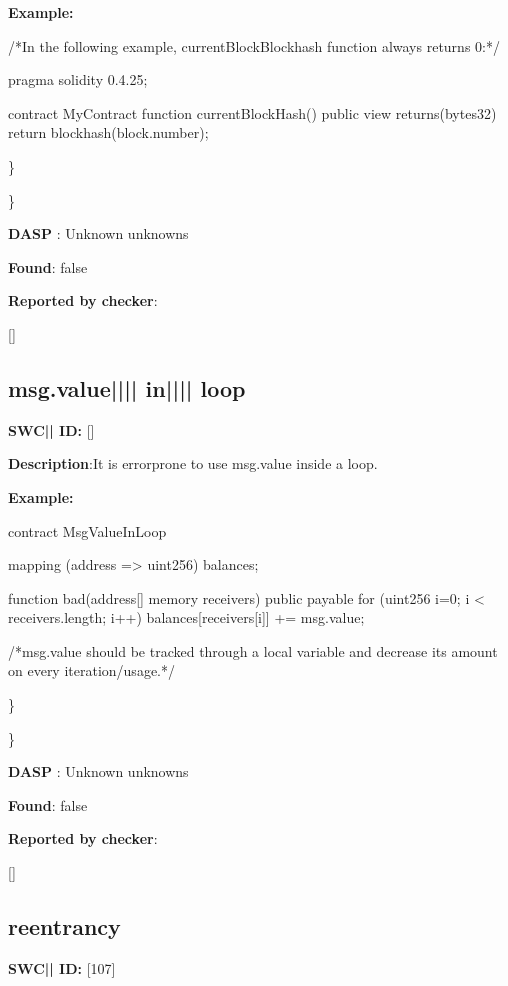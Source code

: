 \documentclass{article}
\begin{document}
\textbf{Example:} 
\begin{ffcode} 

/*In the following example, currentBlockBlockhash function always returns 0:*/ 

pragma solidity 0.4.25;

contract MyContract {
    function currentBlockHash() public view returns(bytes32) {
        return blockhash(block.number);
    }
}

\end{ffcode} 
\} 

\} 

\textbf{DASP} : Unknown unknowns

\textbf{Found}: false

\textbf{Reported by checker}: 
\begin{ffcode} 

[]
\end{ffcode} 
\subsection{msg.value{||\textunderscore|| }in{||\textunderscore|| }loop} 
\textbf{SWC{|\textunderscore| }ID:} []

\textbf{Description}:It is error{\textendash}prone to use msg.value inside a loop.


\textbf{Example:} 
\begin{ffcode} 

contract MsgValueInLoop{
    mapping (address => uint256) balances;

    function bad(address[] memory receivers) public payable {
        for (uint256 i=0; i < receivers.length; i++) {
            balances[receivers[i]] += msg.value;
        }
    }
}

 /*msg.value should be tracked through a local variable and decrease its amount on every iteration/usage.*/ 

\end{ffcode} 
\} 

\} 

\textbf{DASP} : Unknown unknowns

\textbf{Found}: false

\textbf{Reported by checker}: 
\begin{ffcode} 

[]
\end{ffcode} 
\subsection{reentrancy} 
\textbf{SWC{|\textunderscore| }ID:} [107]
\end{document}
